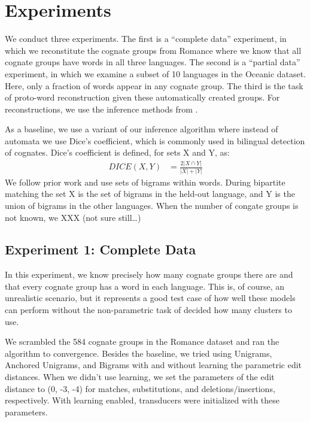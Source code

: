 \documentclass[11pt,a4paper]{article}
\begin{document}
\section{Experiments}

We conduct three experiments. The first is a ``complete data''
experiment, in which we reconstitute the cognate groups from Romance
where we know that all cognate groups have words in all three
languages. The second is a ``partial data'' experiment, in which
we examine a subset of 10 languages in the Oceanic dataset. Here,
only a fraction of words appear in any cognate group. The third is
the task of proto-word reconstruction given these automatically
created groups. For reconstructions, we use the inference methods
from .

As a baseline, we use a variant of our inference algorithm where
instead of automata we use Dice's coefficient, which is commonly
used in bilingual detection of cognates.
\cite{Kondrak01identifyingcognates,Kondrak03cognatescan} Dice's
coefficient is defined, for sets X and Y, as:
\begin{equation}
  \begin{split}
    DICE(X,Y) &= \frac{2 |X\cap Y|}{|X| + |Y|}
   \end{split}
 \end{equation}
We follow prior work and use sets of bigrams within words.  During
bipartite matching the set X is the set of bigrams in the held-out
language, and Y is the union of bigrams in the other languages.
When the number of congate groups is not known,
we XXX (not sure still\dots)

\subsection{Experiment 1: Complete Data}

In this experiment, we know precisely how many cognate groups there
are and that every cognate group has a word in each language. This
is, of course, an unrealistic scenario, but it represents a good
test case of how well these models can perform without the
non-parametric task of decided how many clusters to use.

We scrambled the 584 cognate groups in the Romance dataset and ran
the algorithm to convergence. Besides the baseline, we tried using
Unigrams, Anchored Unigrams, and Bigrams with and without learning
the parametric edit distances. When we didn't use learning, we set
the parameters of the edit distance to (0, -3, -4) for matches,
substitutions, and deletions/insertions, respectively. With learning
enabled, transducers were initialized with these parameters.
\end{document}
